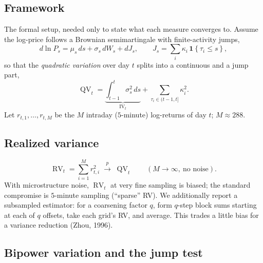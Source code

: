 \documentclass[11pt,a4paper]{article}
\newcommand{\Ind}[1]{\mathbf{1}\!\left\{#1\right\}}
\newcommand{\RV}{\operatorname{RV}}
\newcommand{\IV}{\operatorname{IV}}
\newcommand{\QV}{\operatorname{QV}}
\newcommand{\pto}{\xrightarrow{p}}
\begin{document}
\subsection{Framework}

The formal setup, needed only to state what each measure converges to. Assume
the log-price follows a Brownian semimartingale with finite-activity jumps,
\begin{equation}
  d\ln P_s = \mu_s\,ds + \sigma_s\,dW_s + dJ_s,
  \qquad J_s = \sum_{i} \kappa_i\,\Ind{\tau_i \le s},
\end{equation}
so that the \emph{quadratic variation} over day $t$ splits into a continuous and
a jump part,
\begin{equation}
  \QV_t = \underbrace{\int_{t-1}^{t}\sigma_s^2\,ds}_{\IV_t}
        + \sum_{\tau_i\in(t-1,t]} \kappa_i^2 .
\end{equation}
Let $r_{t,1},\dots,r_{t,M}$ be the $M$ intraday ($5$-minute) log-returns of
day $t$; $M\approx 288$.

\subsection{Realized variance}

\begin{equation}
  \RV_t = \sum_{i=1}^{M} r_{t,i}^2 \;\pto\; \QV_t
  \qquad (M\to\infty,\ \text{no noise}).
\end{equation}
With microstructure noise, $\RV_t$ at very fine sampling is biased; the standard
compromise is $5$-minute sampling (``sparse'' RV). We additionally report a
subsampled estimator: for a coarsening factor $q$, form $q$-step block sums
starting at each of $q$ offsets, take each grid's RV, and average. This trades a
little bias for a variance reduction (Zhou, 1996).

\subsection{Bipower variation and the jump test}
\end{document}
